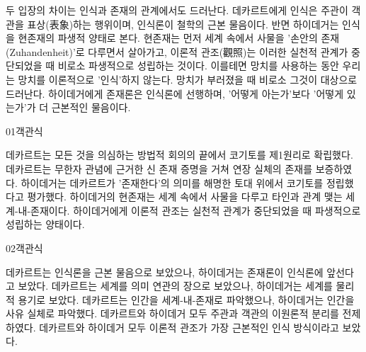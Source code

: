 \documentclass[fs85,seriesWit]{korfarm-base}
\begin{document}
{두 입장의 차이는 인식과 존재의 관계에서도 드러난다. 데카르트에게 인식은 주관이 객관을 표상(表象)하는 행위이며, 인식론이 철학의 근본 물음이다. 반면 하이데거는 인식을 현존재의 파생적 양태로 본다. 현존재는 먼저 세계 속에서 사물을 '손안의 존재(Zuhandenheit)'로 다루면서 살아가고, 이론적 관조(觀照)는 이러한 실천적 관계가 중단되었을 때 비로소 파생적으로 성립하는 것이다. 이를테면 망치를 사용하는 동안 우리는 망치를 이론적으로 '인식'하지 않는다. 망치가 부러졌을 때 비로소 그것이 대상으로 드러난다. 하이데거에게 존재론은 인식론에 선행하며, '어떻게 아는가'보다 '어떻게 있는가'가 더 근본적인 물음이다.
}\kfResetAreaFlag
{}

\kfBeginMC
\begin{kfQBlock}{01}{객관식}
\begin{kfChoices}
\kfChoice 데카르트는 모든 것을 의심하는 방법적 회의의 끝에서 코기토를 제1원리로 확립했다.
\kfChoice 데카르트는 무한자 관념에 근거한 신 존재 증명을 거쳐 연장 실체의 존재를 보증하였다.
\kfChoice 하이데거는 데카르트가 '존재한다'의 의미를 해명한 토대 위에서 코기토를 정립했다고 평가했다.
\kfChoice 하이데거의 현존재는 세계 속에서 사물을 다루고 타인과 관계 맺는 세계-내-존재이다.
\kfChoice 하이데거에게 이론적 관조는 실천적 관계가 중단되었을 때 파생적으로 성립하는 양태이다.
\end{kfChoices}
\end{kfQBlock}

\begin{kfQBlock}{02}{객관식}
\begin{kfChoices}
\kfChoice 데카르트는 인식론을 근본 물음으로 보았으나, 하이데거는 존재론이 인식론에 앞선다고 보았다.
\kfChoice 데카르트는 세계를 의미 연관의 장으로 보았으나, 하이데거는 세계를 물리적 용기로 보았다.
\kfChoice 데카르트는 인간을 세계-내-존재로 파악했으나, 하이데거는 인간을 사유 실체로 파악했다.
\kfChoice 데카르트와 하이데거 모두 주관과 객관의 이원론적 분리를 전제하였다.
\kfChoice 데카르트와 하이데거 모두 이론적 관조가 가장 근본적인 인식 방식이라고 보았다.
\end{kfChoices}
\end{kfQBlock}
\end{document}
